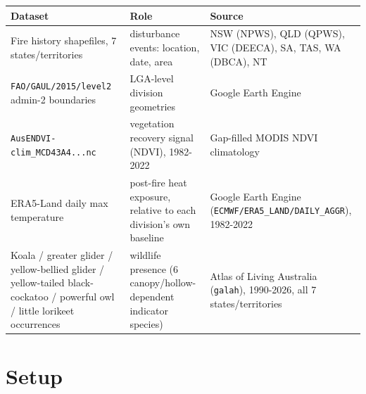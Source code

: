 \documentclass[
  letterpaper,
  DIV=11,
  numbers=noendperiod]{scrartcl}
\begin{document}
\begin{longtable}[]{@{}
  >{\raggedright\arraybackslash}p{}
  >{\raggedright\arraybackslash}p{}
  >{\raggedright\arraybackslash}p{}@{}}
\toprule\noalign{}
\begin{minipage}[b]{\linewidth}\raggedright
Dataset
\end{minipage} & \begin{minipage}[b]{\linewidth}\raggedright
Role
\end{minipage} & \begin{minipage}[b]{\linewidth}\raggedright
Source
\end{minipage} \\
\midrule\noalign{}
\endhead
\bottomrule\noalign{}
\endlastfoot
Fire history shapefiles, 7 states/territories & disturbance events:
location, date, area & NSW (NPWS), QLD (QPWS), VIC (DEECA), SA, TAS, WA
(DBCA), NT \\
\texttt{FAO/GAUL/2015/level2} admin-2 boundaries & LGA-level division
geometries & Google Earth Engine \\
\texttt{AusENDVI-clim\_MCD43A4...nc} & vegetation recovery signal
(NDVI), 1982-2022 & Gap-filled MODIS NDVI climatology \\
ERA5-Land daily max temperature & post-fire heat exposure, relative to
each division's own baseline & Google Earth Engine
(\texttt{ECMWF/ERA5\_LAND/DAILY\_AGGR}), 1982-2022 \\
Koala / greater glider / yellow-bellied glider / yellow-tailed
black-cockatoo / powerful owl / little lorikeet occurrences & wildlife
presence (6 canopy/hollow-dependent indicator species) & Atlas of Living
Australia (\texttt{galah}), 1990-2026, all 7 states/territories \\
\end{longtable}

\section{Setup}\label{setup}
\end{document}
